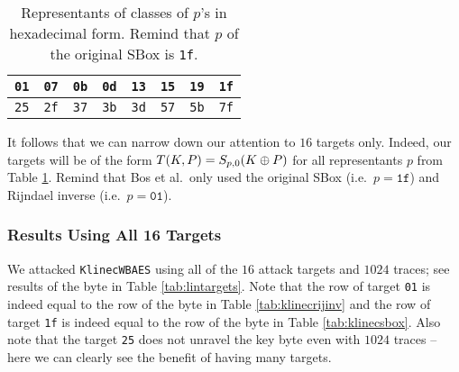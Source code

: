 \begin{table}[h]
	\begin{center}
	\begin{tabular}{| c | c | c | c | c | c | c | c |}
		\hline
		{\tt 01} & {\tt 07} & {\tt 0b} & {\tt 0d} & {\tt 13} & {\tt 15} & {\tt 19} & {\tt 1f} \\
		\hline
		{\tt 25} & {\tt 2f} & {\tt 37} & {\tt 3b} & {\tt 3d} & {\tt 57} & {\tt 5b} & {\tt 7f} \\
		\hline
	\end{tabular}
	\end{center}
\caption{Representants of classes of $p$'s in hexadecimal form. Remind that $p$ of the original SBox is {\tt 1f}.}
\label{tab:classrepre}
\end{table}

It follows that we can narrow down our attention to $16$ targets only. Indeed, our targets will be of the form $T(K,P) = S_{p,0}(K\oplus P)$ for all representants $p$ from Table \ref{tab:classrepre}. Remind that Bos et al.\ only used the original SBox (i.e.\ $p = \texttt{1f}$) and Rijndael inverse (i.e.\ $p = \texttt{01}$).

\subsubsection{Results Using All 16 Targets}
	
	We attacked {\tt KlinecWBAES} using all of the $16$ attack targets and $1024$ traces; see results of the  byte in Table \ref{tab:lintargets}. Note that the row of target {\tt 01} is indeed equal to the row of the  byte in Table \ref{tab:klinecrijinv} and the row of target {\tt 1f} is indeed equal to the row of the  byte in Table \ref{tab:klinecsbox}. Also note that the target {\tt 25} does not unravel the  key byte even with $1024$ traces -- here we can clearly see the benefit of having many targets.
	


